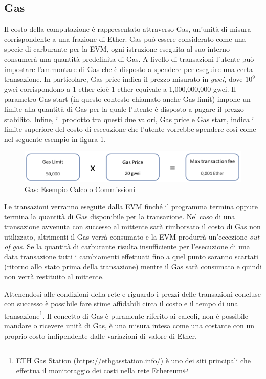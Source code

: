 \subsection{Gas}

Il costo della computazione è rappresentato attraverso Gas, un’unità di misura corrispondente a una frazione di Ether. Gas può essere considerato come una specie di carburante per la EVM, ogni istruzione eseguita al suo interno consumerà una quantità predefinita di Gas. A livello di transazioni l’utente può impostare l’ammontare di Gas che è disposto a spendere per eseguire una certa transazione. In particolare, Gas price indica il prezzo misurato in \emph{gwei}, dove \(10^{9}\) gwei corrispondono a 1 ether cioè 1 ether equivale a 1,000,000,000 gwei. Il parametro Gas start (in questo contesto chiamato anche Gas limit) impone un limite alla quantità di Gas per la quale l’utente è disposto a pagare il prezzo stabilito.
Infine, il prodotto tra questi due valori, Gas price e Gas start, indica il limite superiore del costo di esecuzione che l’utente vorrebbe spendere così come nel seguente esempio in figura \ref{fig:GasEth}.

\begin{figure}[H]
\centering
\includegraphics[width=1\textwidth]{immagini/gas.png}
\caption{Gas: Esempio Calcolo Commissioni}
\label{fig:GasEth}
\end{figure}

Le transazioni verranno eseguite dalla EVM finché il programma termina oppure termina la quantità di Gas disponibile per la transazione. Nel caso di una transazione avvenuta con successo al mittente sarà rimborsato il costo di Gas non utilizzato, altrimenti il Gas verrà consumato e la EVM produrrà un'eccezione \emph{out of gas}. Se la quantità di carburante risulta insufficiente per l'esecuzione di una data transazione tutti i cambiamenti effettuati fino a quel punto saranno scartati (ritorno allo stato prima della transazione) mentre il Gas sarà consumato e quindi non verrà restituito al mittente.

Attenendosi alle condizioni della rete e riguardo i prezzi delle transazioni concluse con successo è possibile fare stime affidabili circa il costo e il tempo di una transazione\footnote{ETH Gas Station (https://ethgasstation.info/) è uno dei siti principali che effettua il monitoraggio dei costi nella rete Ethereum}. Il concetto di Gas è puramente riferito ai calcoli, non è possibile mandare o ricevere unità di Gas, è una misura intesa come una costante con un proprio costo indipendente dalle variazioni di valore di Ether.

